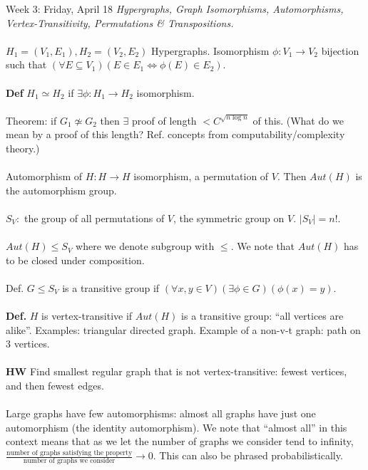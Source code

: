 \documentclass[12pt]{article}
\theoremstyle{remark}
\begin{document}
\label{9}\begin{section}{Week 3: Friday, April 18}
\indent\textit{Hypergraphs, Graph Isomorphisms, Automorphisms, Vertex-Transitivity, Permutations \& Transpositions.}\\\\
$H_1 = (V_1,E_1), H_2 = (V_2,E_2)$ Hypergraphs. Isomorphism $\phi: V_1 \to V_2$ bijection such that $(\forall E \subseteq V_1)(E \in E_1 \Leftrightarrow \phi(E) \in E_2)$.
\\\\
\textbf{Def} $H_1 \simeq H_2$ if $\exists \phi: H_1 \to H_2$ isomorphism. 
\\\\
Theorem: if $G_1 \not \simeq G_2$ then $\exists$ proof of length $<C^{\sqrt{n \log n}}$ of this. (What do we mean by a proof of this length? Ref. concepts from computability/complexity theory.)
\\\\
Automorphism of $H: H \to H$ isomorphism, a permutation of $V$. Then $Aut(H)$ is the automorphism group.
\\\\
$S_V:$ the group of all permutations of $V$, the symmetric group on $V$. $|S_V| = n!$.
\\\\
$Aut(H) \leqslant S_V$ where we denote subgroup with $\leqslant$. We note that $Aut(H)$ has to be closed under composition.
\\\\
Def. $G \leqslant S_V$ is a transitive group if $(\forall x,y \in V)(\exists \phi \in G)(\phi(x) =y)$.
\\\\
\textbf{Def.} $H$ is vertex-transitive if $Aut(H)$ is a transitive group: ``all vertices are alike''. Examples: triangular directed graph. Example of a non-v-t graph: path on 3 vertices.
\\\\
\textbf{HW} Find smallest regular graph that is not vertex-transitive: fewest vertices, and then fewest edges.
\\\\
Large graphs have few automorphisms: almost all graphs have just one automorphism (the identity automorphism). We note that ``almost all'' in this context means that as we let the number of graphs we consider tend to infinity, $\frac{\text{number of graphs satisfying the property}}{\text{number of graphs we consider}} \to 0$. This can also be phrased probabilistically.
\\\\

\end{section}
\end{document}
